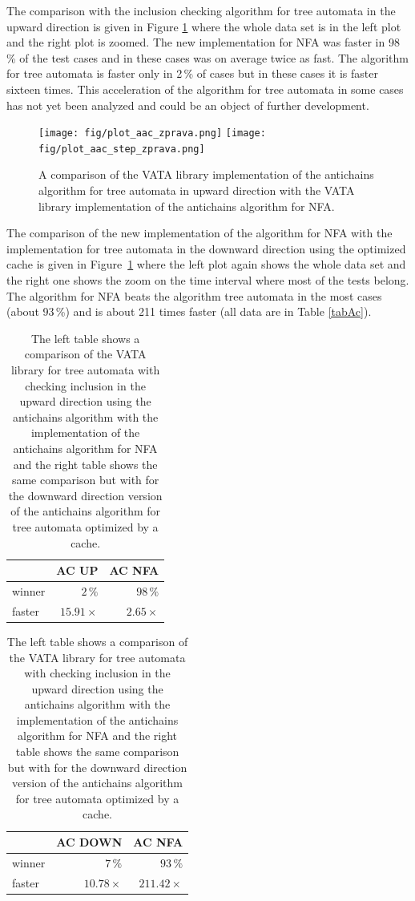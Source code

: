 The comparison with the inclusion checking algorithm for tree automata in the upward direction is given in Figure \ref{fig:figPlotAac} where the whole data
set is in the left plot and the right plot is zoomed. The new implementation for NFA was faster in 98\,\% of the
test cases and in these cases was on average twice as fast. The algorithm for tree automata is faster only in 2\,\% of cases 
but in these cases it is faster sixteen times.
This acceleration of the algorithm for tree automata in some cases has not yet been analyzed and could be an object of further development.

\begin{figure}[bt]
\begin{center}
\texttt{[image: fig/plot\_aac\_zprava.png]}
\texttt{[image: fig/plot\_aac\_step\_zprava.png]}
\caption{A comparison of the VATA library implementation of the antichains algorithm for tree automata in upward direction
    with the VATA library implementation of the antichains algorithm for NFA.}
\label{fig:figPlotAac}
\end{center}
\end{figure}

The comparison of the new implementation of the algorithm for NFA with the implementation for tree automata in the downward direction using the optimized cache
is given in Figure~\ref{fig:figPlotAac} 
where the left plot again shows the whole data set and the right one shows the zoom on the time interval where most of the tests belong.
The algorithm for NFA beats the algorithm tree automata in the most cases (about 93\,\%) and is about 211 times faster (all data are in Table \ref{tabAc}).

\begin{table}[bt]
\begin{center}
\parbox{.45\linewidth}{
  \begin{tabular}[scale=0.3]{ | l | r | r |}
   \hline
    & \textbf{AC UP} & \textbf{AC NFA} \\ \hline \hline
    winner & $2\,\%$ & $98\,\%$ \\ \hline
    faster & $15.91\times$ & $2.65\times$ \\ \hline
   \end{tabular}
}
   \parbox{.45\linewidth}{
  \begin{tabular}{ | l | r | r |}
   \hline
    & \textbf{AC DOWN} & \textbf{AC NFA} \\ \hline \hline
    winner & $7\,\%$ & $93\,\%$ \\ \hline
    faster & $10.78\times$ & $211.42\times$ \\ \hline
   \end{tabular}
   }
   \caption{The left table shows a comparison of the VATA library for tree automata with checking inclusion in the 
     upward direction using the antichains algorithm with the implementation of the antichains algorithm for NFA and
   the right table shows the same comparison but with for the downward direction version of the antichains algorithm for tree automata optimized
   by a cache.}
   \label{tabAac}
\end{center}
\end{table}



